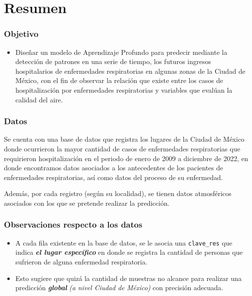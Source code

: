 
\section{Resumen} %


\begin{frame}
	\frametitle{Objetivo}
	\begin{itemize}
		\item Diseñar un modelo de Aprendizaje Profundo para predecir mediante la detección de patrones en una serie de tiempo, los futuros ingresos hospitalarios de enfermedades respiratorias en algunas zonas de la Ciudad de México, con el fin de observar la relación que existe entre los casos de hospitalización por enfermedades respiratorias y variables que evalúan la calidad del aire. 
	\end{itemize}
	
	
\end{frame}


\begin{frame}
	\frametitle{Datos}
	Se cuenta con una base de datos que registra los lugares de la Ciudad de México donde ocurrieron la mayor cantidad de casos de enfermedades respiratorias que requirieron hospitalización en el periodo de enero de 2009 a diciembre de 2022, en donde encontramos datos asociados a los antecedentes de los pacientes de enfermedades respiratorias, así como datos del proceso de su enfermedad.
	
	\vspace{7mm}
	Además, por cada registro (según su localidad), se tienen datos atmosféricos asociados con los que se pretende realizar la predicción. 

        
\end{frame}

\begin{frame}
	\frametitle{Observaciones respecto a los datos}
	\begin{itemize}
		
		\item A cada fila existente en la base de datos, se le asocia una \texttt{clave\_res} que indica \textit{\textbf{el lugar específico}} en donde se registra la cantidad de personas que sufrieron de alguna enfermedad respiratoria.
		
		\item Esto sugiere que quizá la cantidad de muestras no alcance para realizar una predicción \textbf{\textit{global}} \textit{(a nivel Ciudad de México)} con precisión adecuada.
		
	\end{itemize}
	
\end{frame}

